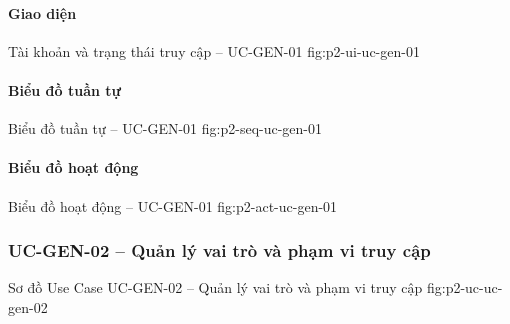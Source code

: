 \par\medskip
\noindent\begin{minipage}{\linewidth}
\paragraph{Giao diện}
  {Tài khoản và trạng thái truy cập -- UC-GEN-01}
  {fig:p2-ui-uc-gen-01}
\end{minipage}\par

\clearpage
\paragraph{Biểu đồ tuần tự}
  {Biểu đồ tuần tự -- UC-GEN-01}
  {fig:p2-seq-uc-gen-01}

\clearpage
\paragraph{Biểu đồ hoạt động}
  {Biểu đồ hoạt động -- UC-GEN-01}
  {fig:p2-act-uc-gen-01}

\clearpage
\subsubsection{UC-GEN-02 -- Quản lý vai trò và phạm vi truy cập}

  {Sơ đồ Use Case UC-GEN-02 -- Quản lý vai trò và phạm vi truy cập}
  {fig:p2-uc-uc-gen-02}

